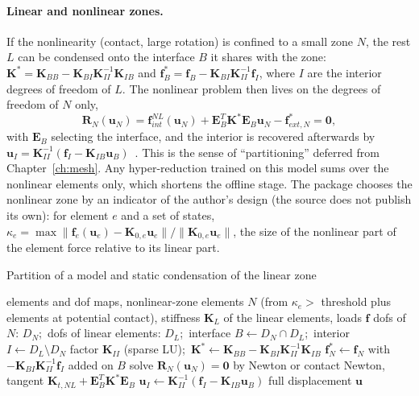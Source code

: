 
\paragraph{Linear and nonlinear zones.}
If the nonlinearity (contact, large rotation) is confined to a small zone $N$, the rest $L$ can be condensed onto the interface $B$ it shares with the zone: $\bm K^*=\bm K_{BB}-\bm K_{BI}\bm K_{II}^{-1}\bm K_{IB}$ and $\bm f_B^*=\bm f_B-\bm K_{BI}\bm K_{II}^{-1}\bm f_I$, where $I$ are the interior degrees of freedom of $L$. The nonlinear problem then lives on the degrees of freedom of $N$ only,
\begin{equation}\label{eq:hy-part}
\bm R_N(\bm u_N)=\bm f^{NL}_{int}(\bm u_N)+\bm E_B^T\bm K^*\bm E_B\bm u_N-\bm f^*_{ext,N}=\bm0,
\end{equation}
with $\bm E_B$ selecting the interface, and the interior is recovered afterwards by $\bm u_I=\bm K_{II}^{-1}(\bm f_I-\bm K_{IB}\bm u_B)$~\cite{nikiema2026assembly}. This is the sense of ``partitioning'' deferred from Chapter~\ref{ch:mesh}. Any hyper-reduction trained on this model sums over the nonlinear elements only, which shortens the offline stage. The package chooses the nonlinear zone by an indicator of the author's design (the source does not publish its own): for element $e$ and a set of states, $\kappa_e=\max\|\bm f_e(\bm u_e)-\bm K_{0,e}\bm u_e\|/\|\bm K_{0,e}\bm u_e\|$, the size of the nonlinear part of the element force relative to its linear part.


\begin{algbox}{Partition of a model and static condensation of the linear zone}
\begin{pseudo}
\Require elements and dof maps, nonlinear-zone elements $N$ (from $\kappa_e>$ threshold plus elements at potential contact), stiffness $\bm K_L$ of the linear elements, loads $\bm f$
\State dofs of $N$: $D_N$;\ dofs of linear elements: $D_L$;\ interface $B\gets D_N\cap D_L$;\ interior $I\gets D_L\setminus D_N$
\State factor $\bm K_{II}$ (sparse LU);\ $\bm K^\ast\gets\bm K_{BB}-\bm K_{BI}\bm K_{II}^{-1}\bm K_{IB}$ 
\State $\bm f^\ast_N\gets\bm f_N$ with $-\bm K_{BI}\bm K_{II}^{-1}\bm f_I$ added on $B$
\State solve $\bm R_N(\bm u_N)=\bm 0$ by Newton or contact Newton, tangent $\bm K_{t,NL}+\bm E_B^T\bm K^\ast\bm E_B$
\State $\bm u_I\gets\bm K_{II}^{-1}(\bm f_I-\bm K_{IB}\bm u_B)$
\Ensure full displacement $\bm u$
\end{pseudo}
\end{algbox}

